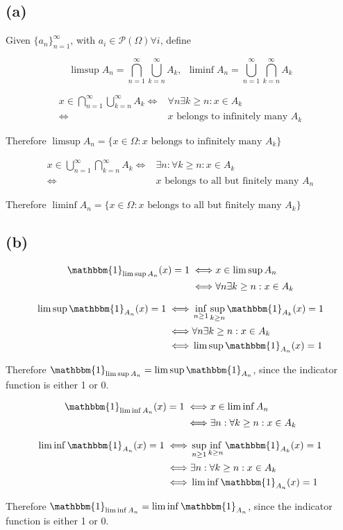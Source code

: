 \subsection*{(a)}

Given $\{a_n\}_{n=1}^{\infty}$, with $a_i\in\mathcal{P}(\Omega)\forall i$, define

$$
\limsup A_n = \bigcap_{n=1}^{\infty}\bigcup_{k=n}^{\infty} A_k
,\:\:
\liminf A_n = \bigcup_{n=1}^{\infty}\bigcap_{k=n}^{\infty} A_k
$$

\begin{align*}
x\in\bigcap_{n=1}^{\infty}\bigcup_{k=n}^{\infty} A_k
\iff & \forall n \exists k\geq n:
x\in A_k 
\\
\iff & x \text{ belongs to infinitely many }A_k
\end{align*}

Therefore $\limsup A_n=\{
x\in\Omega: x\text{ belongs to infinitely many }A_k
\}$

\begin{align*}
x\in\bigcup_{n=1}^{\infty}\bigcap_{k=n}^{\infty} A_k
\iff &
\exists n:\forall k\geq n: x\in A_k
\\ \iff & x \text{ belongs to all but finitely many }A_n
\end{align*}

Therefore $\liminf A_n=\{
x\in\Omega: x\text{ belongs to all but finitely many }A_k
\}$

\subsection*{(b)}

\begin{align*}
\mathbbm{1}_{\limsup A_n}(x)=1
\iff & x\in\limsup A_n
\\
\iff & \forall n \exists k\geq n: x\in A_k 
\end{align*}

\begin{align*}
\limsup \mathbbm{1}_{A_n}(x)=1
\iff & \inf_{n\geq 1} \sup_{k\geq n} \mathbbm{1}_{A_k}(x)=1
\\
\iff & \forall n \exists k\geq n: x\in A_k 
\\
\iff & \limsup \mathbbm{1}_{A_n}(x)=1
\end{align*}

Therefore $\mathbbm{1}_{\limsup A_n}=\limsup \mathbbm{1}_{A_n}$, since the indicator function is either 1 or 0.

\begin{align*}
\mathbbm{1}_{\liminf A_n}(x)=1
\iff & x\in\liminf A_n
\\
\iff & \exists n :\forall k\geq n: x\in A_k 
\end{align*}

\begin{align*}
\liminf \mathbbm{1}_{A_n}(x)=1
\iff & \sup_{n\geq 1} \inf_{k\geq n} \mathbbm{1}_{A_k}(x)=1
\\
\iff & \exists n :\forall k\geq n: x\in A_k 
\\
\iff & \liminf \mathbbm{1}_{A_n}(x)=1
\end{align*}

Therefore $\mathbbm{1}_{\liminf A_n}=\liminf \mathbbm{1}_{A_n}$, since the indicator function is either 1 or 0.

